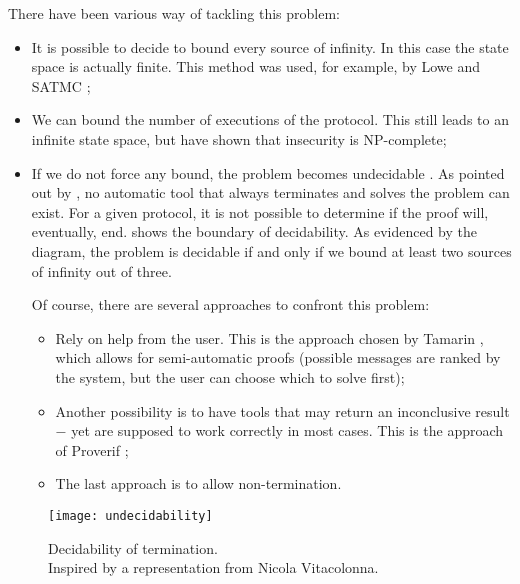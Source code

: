 There have been various way of tackling this problem:
\begin{itemize}
    \item{It is possible to decide to bound every source of infinity. In this case the state space is actually finite. This method was used, for example, by Lowe \cite{LoweNeedhamSchroederPK} and SATMC \cite{SATMC};}

    \item{We can bound the number of executions of the protocol. This still leads to an infinite state space, but \cite{SymbolicModelNPCompleteInsecurity} have shown that insecurity is NP-complete;}
    
    \item{If we do not force any bound, the problem becomes undecidable \cite{SymbolicModelUndecidability1} \cite{SymbolicModelUndecidability2}. As pointed out by \cite{SymbolicVerificationBlanchet}, no automatic tool that always terminates and solves the problem can exist. For a given protocol, it is not possible to determine if the proof will, eventually, end.  shows the boundary of decidability. As evidenced by the diagram, the problem is decidable if and only if we bound at least two sources of infinity out of three.

    Of course, there are several approaches to confront this problem:

    \begin{itemize}
        \item{Rely on help from the user. This is the approach chosen by Tamarin \cite{TamarinFoundations}, which allows for semi-automatic proofs (possible messages are ranked by the system, but the user can choose which to solve first);}
        \item{Another possibility is to have tools that may return an inconclusive result $-$ yet are supposed to work correctly in most cases. This is the approach of Proverif \cite{SymbolicVerificationBlanchet};}
        \item{The last approach is to allow non-termination.}
    \end{itemize}
    }
\end{itemize}


\begin{figure}[t]
    \texttt{[image: undecidability]}
    \centering
    \caption{Decidability of termination.\\Inspired by a representation from Nicola Vitacolonna.}
    \label{fig:undecidability}
\end{figure}







